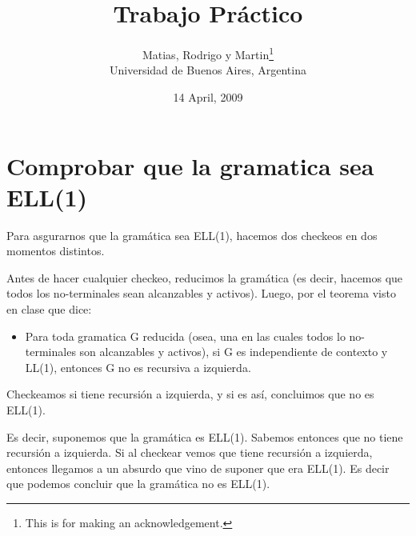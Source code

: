 \documentclass[a4paper]{report}
\begin{document}
	\setcounter{page}{0} %

\title{Trabajo Práctico}
\author{Matias, Rodrigo y Martin\thanks{This is for making an acknowledgement.}
\\Universidad de Buenos Aires, Argentina}
\date{14 April, 2009}



\maketitle


\newpage

\clearpage

\section*{Comprobar que la gramatica sea ELL(1)}

Para asgurarnos que la gramática sea ELL(1), hacemos dos checkeos en dos
momentos distintos.


Antes de hacer cualquier checkeo, reducimos la gramática (es
decir, hacemos que todos los no-terminales sean alcanzables y activos). Luego,
por el teorema visto en clase que dice:
\begin{itemize}
\item Para toda gramatica G reducida (osea, una en las cuales todos lo
	no-terminales son alcanzables y activos), si G es independiente de contexto
	y LL(1), entonces G no es recursiva a izquierda.
\end{itemize}


Checkeamos si tiene recursión a izquierda, y si es así, concluimos que no es
ELL(1).


Es decir, suponemos que la gramática es ELL(1). Sabemos entonces que no
tiene recursión a izquierda. Si al checkear vemos que tiene recursión a
izquierda, entonces llegamos a un absurdo que vino de suponer que era ELL(1). Es
decir que podemos concluir que la gramática no es ELL(1).
\end{document}
